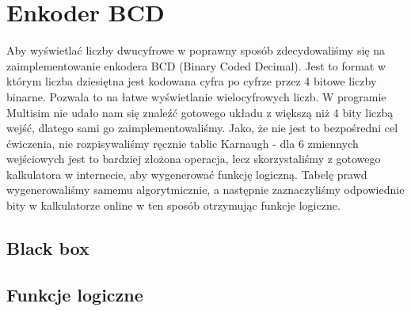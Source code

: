 \documentclass[a4paper]{article}
\begin{document}
\section{Enkoder BCD}
Aby wyświetlać liczby dwucyfrowe w poprawny sposób zdecydowaliśmy się na zaimplementowanie enkodera BCD (Binary Coded Decimal). Jest to format
w którym liczba dziesiętna jest kodowana cyfra po cyfrze przez 4 bitowe liczby binarne. Pozwala to na łatwe wyświetlanie wielocyfrowych liczb.
W programie Multisim nie udało nam się znaleźć gotowego układu z większą niż 4 bity liczbą wejść, dlatego sami go zaimplementowaliśmy. Jako, że 
nie jest to bezpośredni cel ćwiczenia, nie rozpisywaliśmy ręcznie tablic Karnaugh - dla 6 zmiennych wejściowych jest to bardziej złożona operacja, lecz
skorzystaliśmy z gotowego kalkulatora w internecie, aby wygenerować funkcję logiczną. Tabelę prawd wygenerowaliśmy samemu algorytmicznie, a następnie
zaznaczyliśmy odpowiednie bity w kalkulatorze online w ten sposób otrzymując funkcje logiczne.
\subsection{Black box}
\subsection{Funkcje logiczne}
\pagebreak
\end{document}
